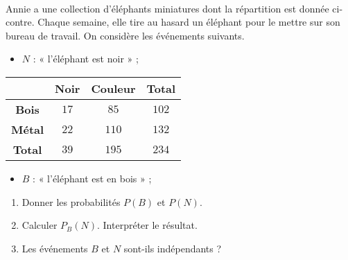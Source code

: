 \documentclass[11pt]{article}
\begin{document}
\begin{exo}[$3,5$ points]~\\
\begin{minipage}{.55\textwidth}
  Annie a une collection d'éléphants miniatures dont la répartition est donnée
  ci-contre. Chaque semaine, elle tire au hasard un éléphant pour le mettre sur
  son bureau de travail. On considère les événements suivants.
  \begin{itemize}
    \item $N$ : « l'éléphant est noir » ;
  \end{itemize}
  \end{minipage}
\begin{minipage}{.45\textwidth}
  \begin{center}
 \begin{tabular}{cccc}
  \toprule
  & \textbf{Noir} & \textbf{Couleur} & \textbf{Total} \\
  \midrule
  \textbf{Bois} & $17$ & $85$ & $102$ \\
  \textbf{Métal} & $22$ & $110$ & $132$ \\
  \textbf{Total} & $39$ & $195$ & $234$ \\
  \bottomrule
\end{tabular}
  \end{center}
\end{minipage}
  \begin{itemize}
    \item $B$ : « l'éléphant est en bois » ;
  \end{itemize}
  \begin{enumerate}
    \item Donner les probabilités $P(B)$ et $P(N)$.
    \item Calculer $P_B(N)$. Interpréter le résultat.
    \item Les événements $B$ et $N$ sont-ils indépendants ?
  \end{enumerate}
\end{exo}
\setcounter{exo}{0}
~\vspace{4mm}
\end{document}
